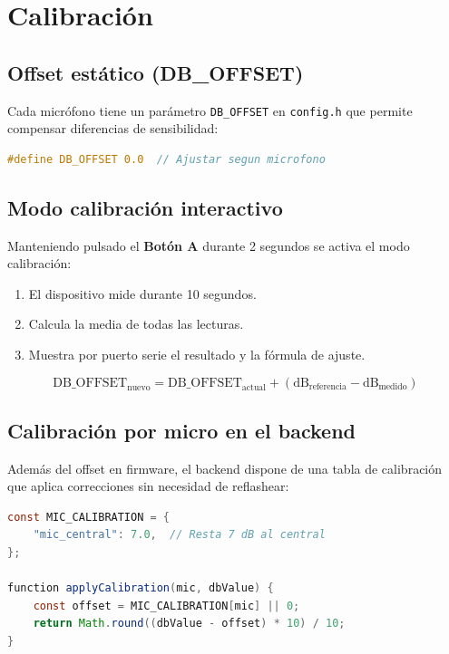 \documentclass[12pt,a4paper]{report}
\begin{document}
\section{Calibraci\'on}

\subsection{Offset est\'atico (DB\_OFFSET)}

Cada micr\'ofono tiene un par\'ametro \texttt{DB\_OFFSET} en \texttt{config.h} que permite compensar diferencias de sensibilidad:

\begin{lstlisting}[language=C]
#define DB_OFFSET 0.0  // Ajustar segun microfono
\end{lstlisting}

\subsection{Modo calibraci\'on interactivo}

Manteniendo pulsado el \textbf{Bot\'on A} durante 2 segundos se activa el modo calibraci\'on:

\begin{enumerate}
    \item El dispositivo mide durante 10 segundos.
    \item Calcula la media de todas las lecturas.
    \item Muestra por puerto serie el resultado y la f\'ormula de ajuste.
\end{enumerate}

\begin{equation}
\text{DB\_OFFSET}_{\text{nuevo}} = \text{DB\_OFFSET}_{\text{actual}} + (\text{dB}_{\text{referencia}} - \text{dB}_{\text{medido}})
\end{equation}

\subsection{Calibraci\'on por micro en el backend}

Adem\'as del offset en firmware, el backend dispone de una tabla de calibraci\'on que aplica correcciones sin necesidad de reflashear:

\begin{lstlisting}[language=Java, caption={Calibraci\'on en el backend (index.js)}]
const MIC_CALIBRATION = {
    "mic_central": 7.0,  // Resta 7 dB al central
};

function applyCalibration(mic, dbValue) {
    const offset = MIC_CALIBRATION[mic] || 0;
    return Math.round((dbValue - offset) * 10) / 10;
}
\end{lstlisting}
\end{document}
